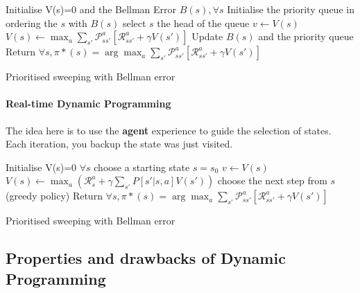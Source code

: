		\begin{algorithm}[H]
				Initialise V(s)=0 and the Bellman Error $B(s), \forall s$ \;
				Initialise the priority queue in ordering the $s$ with $B(s)$\;
				{
					select $s$ the head of the queue
					{
						$v \leftarrow V(s)$ \;
						$V(s) \leftarrow \max_a \sum_{s'} \mathcal{P}^a_{ss'}[\mathcal{R}^a_{ss'} + \gamma V(s')]$ \;
						Update $B(s)$ and the priority queue \;
					}
				}
				Return $\forall s, \pi*(s) = \arg \max_a  \sum_{s'} \mathcal{P}^a_{ss'}[\mathcal{R}^a_{ss'} + \gamma V(s')]$ \;
				\caption{Prioritised sweeping with Bellman error}
			\end{algorithm}


		\paragraph{Real-time Dynamic Programming} %
			\label{par:real_time_dynamic_programming}

			The idea here is to use the \textbf{agent} experience to guide the selection of states. Each iteration, you backup the state was just visited.

			\begin{algorithm}[H]
				Initialise V(s)=0 $ \forall s$ \;
				choose a starting state $s = s_0$\;
				{
					{
						$v \leftarrow V(s)$ \;
						$V(s) \leftarrow \max_a ( \mathcal{R}^a_{s} +  \gamma \sum_{s'} P[s' | s, a] V(s'))$ \;
						choose the next step from $s$ (greedy policy)\;
					}
				}
				Return $\forall s, \pi*(s) = \arg \max_a  \sum_{s'} \mathcal{P}^a_{ss'}[\mathcal{R}^a_{ss'} + \gamma V(s')]$ \;
				\caption{Prioritised sweeping with Bellman error}
			\end{algorithm}

		

	
	\subsection{Properties and drawbacks of Dynamic Programming} %
		\label{sub:properties_and_drawbacks_of_dynamic_programming}
	
